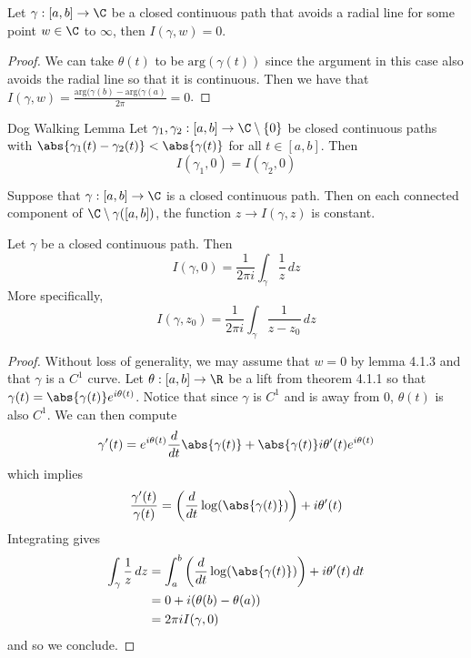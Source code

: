 \documentclass[a4paper]{article}
\begin{document}
\begin{lmm}{}{} Let $\gamma:[a,b]\to\C$ be a closed continuous path that avoids a radial line for some point $w\in\C$ to $\infty$, then $I(\gamma,w)=0$. 
\begin{proof}
We can take $\theta(t)$ to be $\text{arg}(\gamma(t))$ since the argument in this case also avoids the radial line so that it is continuous. Then we have that $I(\gamma,w)=\frac{\text{arg}(\gamma(b)-\text{arg}(\gamma(a)}{2\pi }=0$. 
\end{proof}
\end{lmm}

\begin{lmm}{Dog Walking Lemma}{} Let $\gamma_1,\gamma_2:[a,b]\to\C\setminus\{0\}$ be closed continuous paths with $\abs{\gamma_1(t)-\gamma_2(t)}<\abs{\gamma(t)}$ for all $t\in[a,b]$. Then $$I(\gamma_1,0)=I(\gamma_2,0)$$
\end{lmm}

\begin{lmm}{}{} Suppose that $\gamma:[a,b]\to\C$ is a closed continuous path. Then on each connected component of $\C\setminus\gamma([a,b])$, the function $z\to I(\gamma,z)$ is constant. 
\end{lmm}

\begin{thm}{}{} Let $\gamma$ be a closed continuous path. Then $$I(\gamma,0)=\frac{1}{2\pi i}\int_{\gamma}\frac{1}{z}\,dz$$ More specifically, $$I(\gamma,z_0)=\frac{1}{2\pi i}\int_{\gamma}\frac{1}{z-z_0}\,dz$$ 
\begin{proof}
Without loss of generality, we may assume that $w=0$ by lemma 4.1.3 and that $\gamma$ is a $C^1$ curve. Let $\theta:[a,b]\to\R$ be a lift from theorem 4.1.1 so that $\gamma(t)=\abs{\gamma(t)}e^{i\theta(t)}$. Notice that since $\gamma$ is $C^1$ and is away from $0$, $\theta(t)$ is also $C^1$. We can then compute $$\gamma'(t)=e^{i\theta(t)}\frac{d}{dt}\abs{\gamma(t)}+\abs{\gamma(t)}i\theta'(t)e^{i\theta(t)}$$ which implies $$\frac{\gamma'(t)}{\gamma(t)}=\left(\frac{d}{dt}\log(\abs{\gamma(t)})\right)+i\theta'(t)$$ Integrating gives 
\begin{align*}
\int_\gamma\frac{1}{z}\,dz&=\int_a^b\left(\frac{d}{dt}\log(\abs{\gamma(t)})\right)+i\theta'(t)\,dt\\
&=0+i(\theta(b)-\theta(a))\\
&=2\pi iI(\gamma,0)
\end{align*}
and so we conclude. 
\end{proof}
\end{thm}
\end{document}
